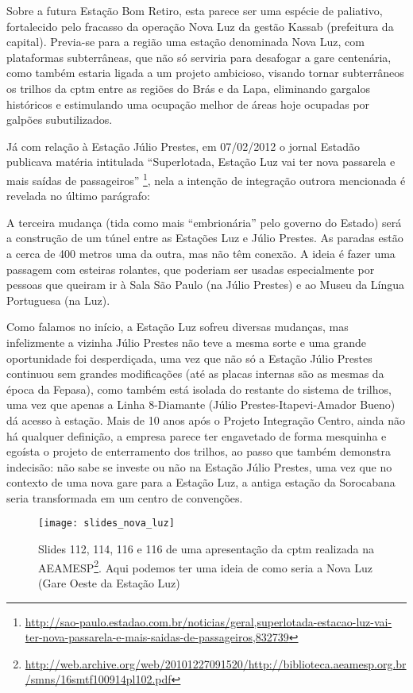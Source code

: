 \documentclass[11pt,fleqn]{book} %
\begin{document}
Sobre a futura Estação Bom Retiro, esta parece ser uma espécie de paliativo, fortalecido pelo fracasso da operação Nova Luz da gestão Kassab (prefeitura da capital). Previa-se para a região uma estação denominada Nova Luz, com plataformas subterrâneas, que não só serviria para desafogar a gare centenária, como também estaria ligada a um projeto ambicioso, visando tornar subterrâneos os trilhos da \gls{cptm} entre as regiões do Brás e da Lapa, eliminando gargalos históricos e estimulando uma ocupação melhor de áreas hoje ocupadas por galpões subutilizados.

Já com relação à Estação Júlio Prestes, em 07/02/2012 o jornal Estadão publicava matéria intitulada ``Superlotada, Estação Luz vai ter nova passarela e mais saídas de passageiros'' \footnote{\url{http://sao-paulo.estadao.com.br/noticias/geral,superlotada-estacao-luz-vai-ter-nova-passarela-e-mais-saidas-de-passageiros,832739}}, nela a intenção de integração outrora mencionada é revelada no último parágrafo:

\begin{citacao}
	A terceira mudança (tida como mais “embrionária” pelo governo do Estado) será a construção de um túnel entre as Estações Luz e Júlio Prestes. As paradas estão a cerca de 400 metros uma da outra, mas não têm conexão. A ideia é fazer uma passagem com esteiras rolantes, que poderiam ser usadas especialmente por pessoas que queiram ir à Sala São Paulo (na Júlio Prestes) e ao Museu da Língua Portuguesa (na Luz).
\end{citacao}

Como falamos no início, a Estação Luz sofreu diversas mudanças, mas infelizmente a vizinha Júlio Prestes não teve a mesma sorte e uma grande oportunidade foi desperdiçada, uma vez que não só a Estação Júlio Prestes continuou sem grandes modificações (até as placas internas são as mesmas da época da Fepasa), como também está isolada do restante do sistema de trilhos, uma vez que apenas a Linha 8-Diamante (Júlio Prestes-Itapevi-Amador Bueno) dá acesso à estação. Mais de 10 anos após o Projeto Integração Centro, ainda não há qualquer definição, a empresa parece ter engavetado de forma mesquinha e egoísta o projeto de enterramento dos trilhos, ao passo que também demonstra indecisão: não sabe se investe ou não na Estação Júlio Prestes, uma vez que no contexto de uma nova gare para a Estação Luz, a antiga estação da Sorocabana seria transformada em um centro de convenções.

\begin{landscape}
\begin{figure}[htb]
	\caption[Nova Luz conforme slides da \gls{cptm} para a AEAMESP]{Slides 112, 114, 116 e 116 de uma apresentação da \gls{cptm} realizada na AEAMESP\footnote{\url{http://web.archive.org/web/20101227091520/http://biblioteca.aeamesp.org.br/smns/16smtf100914pl102.pdf}}. Aqui podemos ter uma ideia de como seria a Nova Luz (Gare Oeste da Estação Luz)}
	\centering
	\texttt{[image: slides\_nova\_luz]}
	\label{fig:slides_nova_luz}
\end{figure}
\end{landscape}
\end{document}

